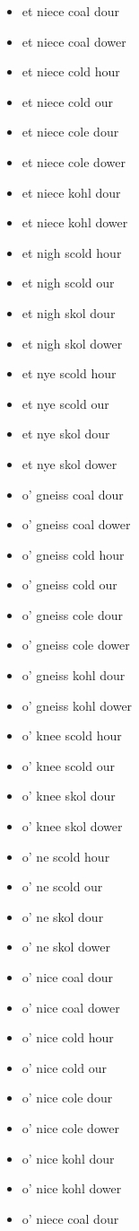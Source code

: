 \begin{itemize}
\item et niece coal dour
\item et niece coal dower
\item et niece cold hour
\item et niece cold our
\item et niece cole dour
\item et niece cole dower
\item et niece kohl dour
\item et niece kohl dower
\item et nigh scold hour
\item et nigh scold our
\item et nigh skol dour
\item et nigh skol dower
\item et nye scold hour
\item et nye scold our
\item et nye skol dour
\item et nye skol dower
\item o' gneiss coal dour
\item o' gneiss coal dower
\item o' gneiss cold hour
\item o' gneiss cold our
\item o' gneiss cole dour
\item o' gneiss cole dower
\item o' gneiss kohl dour
\item o' gneiss kohl dower
\item o' knee scold hour
\item o' knee scold our
\item o' knee skol dour
\item o' knee skol dower
\item o' ne scold hour
\item o' ne scold our
\item o' ne skol dour
\item o' ne skol dower
\item o' nice coal dour
\item o' nice coal dower
\item o' nice cold hour
\item o' nice cold our
\item o' nice cole dour
\item o' nice cole dower
\item o' nice kohl dour
\item o' nice kohl dower
\item o' niece coal dour

\end{itemize}
